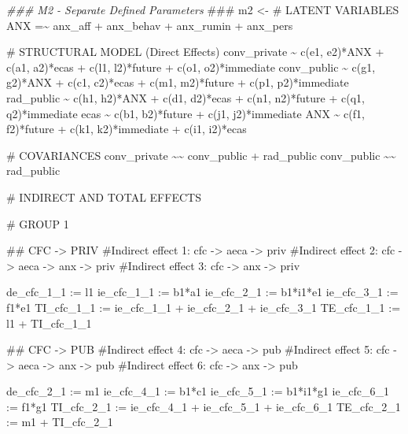 \documentclass[
  letterpaper,
  DIV=11,
  numbers=noendperiod]{scrreprt}
\newenvironment{Shaded}{\begin{snugshade}}{\end{snugshade}}
\newcommand{\AlertTok}[1]{\textcolor[rgb]{0.68,0.00,0.00}{#1}}
\newcommand{\DocumentationTok}[1]{\textcolor[rgb]{0.37,0.37,0.37}{\textit{#1}}}
\newcommand{\NormalTok}[1]{\textcolor[rgb]{0.00,0.23,0.31}{#1}}
\newcommand{\OtherTok}[1]{\textcolor[rgb]{0.00,0.23,0.31}{#1}}
\newcommand{\StringTok}[1]{\textcolor[rgb]{0.13,0.47,0.30}{#1}}
\begin{document}
\begin{Shaded}
\begin{Highlighting}[]
\DocumentationTok{\#\#\# M2 {-} Separate Defined Parameters }\AlertTok{\#\#\#}
\NormalTok{m2 }\OtherTok{\textless{}{-}} \StringTok{\textquotesingle{}}
\StringTok{\# LATENT VARIABLES}
\StringTok{ANX =\textasciitilde{} anx\_aff + anx\_behav + anx\_rumin + anx\_pers}

\StringTok{\# STRUCTURAL MODEL (Direct Effects)}
\StringTok{conv\_private \textasciitilde{} c(e1, e2)*ANX + c(a1, a2)*ecas + c(l1, l2)*future + c(o1, o2)*immediate}
\StringTok{conv\_public \textasciitilde{} c(g1, g2)*ANX + c(c1, c2)*ecas + c(m1, m2)*future + c(p1, p2)*immediate}
\StringTok{rad\_public \textasciitilde{} c(h1, h2)*ANX + c(d1, d2)*ecas + c(n1, n2)*future + c(q1, q2)*immediate}
\StringTok{ecas \textasciitilde{} c(b1, b2)*future + c(j1, j2)*immediate}
\StringTok{ANX \textasciitilde{} c(f1, f2)*future + c(k1, k2)*immediate + c(i1, i2)*ecas}

\StringTok{\# COVARIANCES}
\StringTok{conv\_private \textasciitilde{}\textasciitilde{} conv\_public + rad\_public}
\StringTok{conv\_public \textasciitilde{}\textasciitilde{} rad\_public}

\StringTok{\# INDIRECT AND TOTAL EFFECTS}

\StringTok{\# GROUP 1}

\StringTok{\#\# CFC {-}\textgreater{} PRIV}
\StringTok{\#Indirect effect 1: cfc {-}\textgreater{} aeca {-}\textgreater{} priv}
\StringTok{\#Indirect effect 2: cfc {-}\textgreater{} aeca {-}\textgreater{} anx {-}\textgreater{} priv}
\StringTok{\#Indirect effect 3: cfc {-}\textgreater{} anx {-}\textgreater{} priv}

\StringTok{de\_cfc\_1\_1 := l1}
\StringTok{ie\_cfc\_1\_1 := b1*a1}
\StringTok{ie\_cfc\_2\_1 := b1*i1*e1}
\StringTok{ie\_cfc\_3\_1 := f1*e1}
\StringTok{TI\_cfc\_1\_1 := ie\_cfc\_1\_1 + ie\_cfc\_2\_1 + ie\_cfc\_3\_1}
\StringTok{TE\_cfc\_1\_1 := l1 + TI\_cfc\_1\_1}


\StringTok{\#\# CFC {-}\textgreater{} PUB}
\StringTok{\#Indirect effect 4: cfc {-}\textgreater{} aeca {-}\textgreater{} pub}
\StringTok{\#Indirect effect 5: cfc {-}\textgreater{} aeca {-}\textgreater{} anx {-}\textgreater{} pub}
\StringTok{\#Indirect effect 6: cfc {-}\textgreater{} anx {-}\textgreater{} pub}

\StringTok{de\_cfc\_2\_1 := m1}
\StringTok{ie\_cfc\_4\_1 := b1*c1}
\StringTok{ie\_cfc\_5\_1 := b1*i1*g1}
\StringTok{ie\_cfc\_6\_1 := f1*g1}
\StringTok{TI\_cfc\_2\_1 := ie\_cfc\_4\_1 + ie\_cfc\_5\_1 + ie\_cfc\_6\_1}
\StringTok{TE\_cfc\_2\_1 := m1 + TI\_cfc\_2\_1}



\end{Highlighting}
\end{Shaded}
\end{document}
